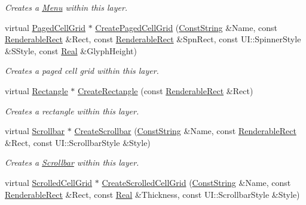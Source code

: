 \begin{DoxyCompactItemize}
\begin{DoxyCompactList}\small\item\em Creates a \hyperlink{classphys_1_1UI_1_1Menu}{Menu} within this layer. \item\end{DoxyCompactList}\item 
virtual \hyperlink{classphys_1_1UI_1_1PagedCellGrid}{PagedCellGrid} $\ast$ \hyperlink{classphys_1_1UI_1_1Layer_a1c8326e5c53dc64d53288883d8a0496a}{CreatePagedCellGrid} (\hyperlink{namespacephys_a5ce5049f8b4bf88d6413c47b504ebb31}{ConstString} \&Name, const \hyperlink{structphys_1_1UI_1_1RenderableRect}{RenderableRect} \&Rect, const \hyperlink{structphys_1_1UI_1_1RenderableRect}{RenderableRect} \&SpnRect, const UI::SpinnerStyle \&SStyle, const \hyperlink{namespacephys_af7eb897198d265b8e868f45240230d5f}{Real} \&GlyphHeight)
\begin{DoxyCompactList}\small\item\em Creates a paged cell grid within this layer. \item\end{DoxyCompactList}\item 
virtual \hyperlink{classphys_1_1UI_1_1Rectangle}{Rectangle} $\ast$ \hyperlink{classphys_1_1UI_1_1Layer_aea42a78478489c92c39e5e0b1ca6d289}{CreateRectangle} (const \hyperlink{structphys_1_1UI_1_1RenderableRect}{RenderableRect} \&Rect)
\begin{DoxyCompactList}\small\item\em Creates a rectangle within this layer. \item\end{DoxyCompactList}\item 
virtual \hyperlink{classphys_1_1UI_1_1Scrollbar}{Scrollbar} $\ast$ \hyperlink{classphys_1_1UI_1_1Layer_ab7ad4b0db348beddfe63d1f9c914f1ca}{CreateScrollbar} (\hyperlink{namespacephys_a5ce5049f8b4bf88d6413c47b504ebb31}{ConstString} \&Name, const \hyperlink{structphys_1_1UI_1_1RenderableRect}{RenderableRect} \&Rect, const UI::ScrollbarStyle \&Style)
\begin{DoxyCompactList}\small\item\em Creates a \hyperlink{classphys_1_1UI_1_1Scrollbar}{Scrollbar} within this layer. \item\end{DoxyCompactList}\item 
virtual \hyperlink{classphys_1_1UI_1_1ScrolledCellGrid}{ScrolledCellGrid} $\ast$ \hyperlink{classphys_1_1UI_1_1Layer_a967b2ff1bcc006a909b623325182da4a}{CreateScrolledCellGrid} (\hyperlink{namespacephys_a5ce5049f8b4bf88d6413c47b504ebb31}{ConstString} \&Name, const \hyperlink{structphys_1_1UI_1_1RenderableRect}{RenderableRect} \&Rect, const \hyperlink{namespacephys_af7eb897198d265b8e868f45240230d5f}{Real} \&Thickness, const UI::ScrollbarStyle \&Style)

\end{DoxyCompactItemize}

